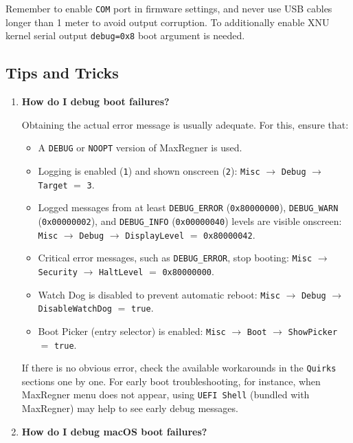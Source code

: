 \documentclass[]{article}
\providecommand{\tightlist}{%
  \setlength{\itemsep}{0pt}\setlength{\parskip}{0pt}}
\begin{document}
Remember to enable \texttt{COM} port in firmware settings, and never use USB cables longer
than 1 meter to avoid output corruption. To additionally enable XNU kernel serial output
\texttt{debug=0x8} boot argument is needed.

\subsection{Tips and Tricks}\label{troubleshootingtricks}

\begin{enumerate}
\item
  \textbf{How do I debug boot failures?}

  Obtaining the actual error message is usually adequate. For this, ensure that:
  \begin{itemize}
  \tightlist
  \item A \texttt{DEBUG} or \texttt{NOOPT} version of MaxRegner is used.
  \item Logging is enabled (\texttt{1}) and shown onscreen (\texttt{2}):
  \texttt{Misc} $\rightarrow$ \texttt{Debug} $\rightarrow$ \texttt{Target}
  $=$ \texttt{3}.
  \item Logged messages from at least \texttt{DEBUG\_ERROR}
  (\texttt{0x80000000}), \texttt{DEBUG\_WARN} (\texttt{0x00000002}), and
  \texttt{DEBUG\_INFO} (\texttt{0x00000040}) levels are visible onscreen:
  \texttt{Misc} $\rightarrow$ \texttt{Debug} $\rightarrow$ \texttt{DisplayLevel}
  $=$ \texttt{0x80000042}.
  \item Critical error messages, such as \texttt{DEBUG\_ERROR}, stop booting:
  \texttt{Misc} $\rightarrow$ \texttt{Security}
  $\rightarrow$ \texttt{HaltLevel} $=$ \texttt{0x80000000}.
  \item Watch Dog is disabled to prevent automatic reboot:
  \texttt{Misc} $\rightarrow$ \texttt{Debug} $\rightarrow$
  \texttt{DisableWatchDog} $=$ \texttt{true}.
  \item Boot Picker (entry selector) is enabled: \texttt{Misc}
  $\rightarrow$ \texttt{Boot} $\rightarrow$ \texttt{ShowPicker} $=$ \texttt{true}.
  \end{itemize}

  If there is no obvious error, check the available workarounds in the \texttt{Quirks} sections
  one by one. For early boot troubleshooting, for instance, when MaxRegner menu does not appear,
  using \texttt{UEFI Shell} (bundled with MaxRegner) may help to see
  early debug messages.

\item
  \textbf{How do I debug macOS boot failures?}


\end{enumerate}
\end{document}
